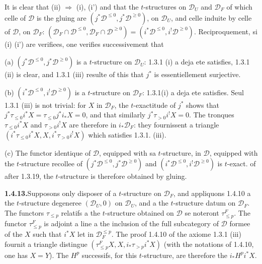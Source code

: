 \documentclass[12pt,a4paper]{article}
\theoremstyle{plain}
\theoremstyle{definition}
\begin{document}
It is clear that (ii) $\Rightarrow$ (i), (i') and that the $t$-structures on $\mathcal{D}_U$ and $\mathcal{D}_F$ of which celle of $\mathcal{D}$ is the gluing are $(j^*\mathcal{D}^{\leqslant 0}, j^*\mathcal{D}^{\geqslant 0})$, on $\mathcal{D}_U$, and celle induite by celle of $\mathcal{D}$, on $\mathcal{D}_F$: $(\mathcal{D}_F \cap \mathcal{D}^{\leqslant 0}, \mathcal{D}_F \cap \mathcal{D}^{\geqslant 0}) = (i^*\mathcal{D}^{\leqslant 0}, i^!\mathcal{D}^{\geqslant 0})$. Reciproquement, si (i) (i') are verifiees, one verifies successivement that

(a) $(j^*\mathcal{D}^{\leqslant 0}, j^*\mathcal{D}^{\geqslant 0})$ is a $t$-structure on $\mathcal{D}_U$: 1.3.1 (i) a deja ete satisfies, 1.3.1 (ii) is clear, and 1.3.1 (iii) resulte of this that $j^*$ is essentiellement surjective.

(b) $(i^*\mathcal{D}^{\leqslant 0}, i^!\mathcal{D}^{\geqslant 0})$ is a $t$-structure on $\mathcal{D}_F$: 1.3.1(i) a deja ete satisfies. Seul 1.3.1 (iii) is not trivial: for $X$ in $\mathcal{D}_F$, the $t$-exactitude of $j^*$ shows that $j^*\tau_{\leqslant 0}i^*X = \tau_{\leqslant 0}j^*i_*X = 0$, and that similarly $j^*\tau_{>0}i^!X = 0$. The tronques $\tau_{\leqslant 0}i^*X$ and $\tau_{>0}i^!X$ are therefore in $i_*\mathcal{D}_F$: they fournissent a triangle $(i^*\tau_{\leqslant 0}i^*X, X, i^*\tau_{>0}i^!X)$ which satisfies 1.3.1. (iii).

(c) The functor identique of $\mathcal{D}$, equipped with sa $t$-structure, in $\mathcal{D}$, equipped with the $t$-structure recollee of $(j^*\mathcal{D}^{\leqslant 0}, j^*\mathcal{D}^{\geqslant 0})$ and $(i^*\mathcal{D}^{\leqslant 0}, i^!\mathcal{D}^{\geqslant 0})$ is $t$-exact. of after 1.3.19, the $t$-structure is therefore obtained by gluing.

\smallskip
\noindent\textbf{1.4.13.}\quad Supposons only disposer of a $t$-structure on $\mathcal{D}_F$, and appliquons 1.4.10 a the $t$-structure degeneree $(\mathcal{D}_U, 0)$ on $\mathcal{D}_U$, and a the $t$-structure datum on $\mathcal{D}_F$. The functors $\tau_{\leqslant p}$ relatifs a the $t$-structure obtained on $\mathcal{D}$ se noteront $\tau_{\leqslant p}^F$. The functor $\tau_{\leqslant p}^F$ is adjoint a line a the inclusion of the full subcategory of $\mathcal{D}$ formee of the $X$ such that $i^*X$ let in $\mathcal{D}_F^{\leqslant p}$. The proof 1.4.10 of the axiome 1.3.1 (iii) fournit a triangle distingue $(\tau_{\leqslant p}^F X, X, i_*\tau_{>p}i^*X)$ (with the notations of 1.4.10, one has $X = Y$). The $H^p$ successifs, for this $t$-structure, are therefore the $i_*H^p i^*X$.
\end{document}

